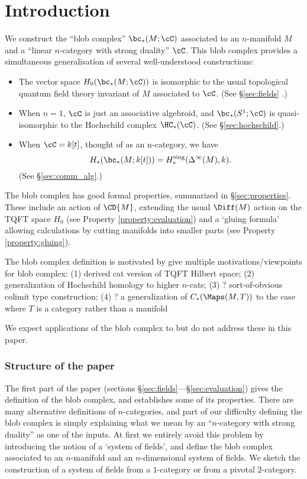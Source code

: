 
\section{Introduction}

We construct the ``blob complex'' $\bc_*(M; \cC)$ associated to an $n$-manifold $M$ and a ``linear $n$-category with strong duality'' $\cC$. This blob complex provides a simultaneous generalisation of several well-understood constructions:
\begin{itemize}
\item The vector space $H_0(\bc_*(M; \cC))$ is isomorphic to the usual topological quantum field theory invariant of $M$ associated to $\cC$. (See \S \ref{sec:fields} .)
\item When $n=1$, $\cC$ is just an associative algebroid, and $\bc_*(S^1; \cC)$ is quasi-isomorphic to the Hochschild complex $\HC_*(\cC)$. (See \S \ref{sec:hochschild}.)
\item When $\cC = k[t]$, thought of as an n-category, we have $$H_*(\bc_*(M; k[t])) = H^{\text{sing}}_*(\Delta^\infty(M), k).$$ (See \S \ref{sec:comm_alg}.)
\end{itemize}
The blob complex has good formal properties, summarized in \S \ref{sec:properties}. These include an action of $\CD{M}$, extending the usual $\Diff(M)$ action on the TQFT space $H_0$ (see Property \ref{property:evaluation}) and a `gluing formula' allowing calculations by cutting manifolds into smaller parts (see Property \ref{property:gluing}).

The blob complex definition is motivated by  give multiple motivations/viewpoints for blob complex: (1) derived cat
version of TQFT Hilbert space; (2) generalization of Hochschild homology to higher $n$-cats;
(3) ? sort-of-obvious colimit type construction;
(4) ? a generalization of $C_*(\Maps(M, T))$ to the case where $T$ is
a category rather than a manifold

We expect applications of the blob complex to  but do not address these in this paper.


\subsubsection{Structure of the paper}

The first part of the paper (sections \S \ref{sec:fields}---\S \ref{sec:evaluation}) gives the definition of the blob complex, and establishes some of its properties. There are many alternative definitions of $n$-categories, and part of our difficulty defining the blob complex is simply explaining what we mean by an ``$n$-category with strong duality'' as one of the inputs. At first we entirely avoid this problem by introducing the notion of a `system of fields', and define the blob complex associated to an $n$-manifold and an $n$-dimensional system of fields. We sketch the construction of a system of fields from a $1$-category or from a pivotal $2$-category.

